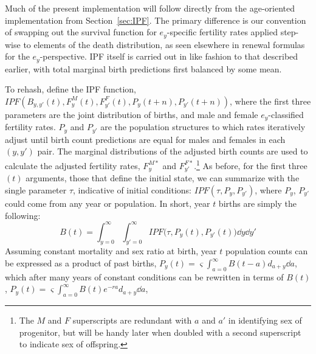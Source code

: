 
Much of the present implementation will follow directly from the age-oriented
implementation from Section~\ref{sec:IPF}. The primary difference is our
convention of swapping out the survival function for $e_y$-specific fertility
rates applied step-wise to elements of the death distribution, as seen elsewhere
in renewal formulas for the $e_y$-perspective. IPF itself is carried out in like
fashion to that described earlier, with total marginal birth predictions
first balanced by some mean. 

To rehash, define the IPF function,
$IPF(B_{y,y'}(t), F_y^M(t), F_{y'}^F(t),P_y(t+n),P_{y'}(t+n))$, where the first
three parameters are the joint distribution of births, and male and female
$e_y$-classified fertility rates. $P_y$ and $P_{y'}$ are the population
structures to which rates iteratively adjust until birth count predictions
are equal for males and females in each $(y,y')$ pair. The marginal distributions of
the adjusted birth counts are used to calculate the adjusted fertility rates,
$F_y^{M\ast}$ and $F_{y'}^{F\ast}$.\footnote{The $M$ and $F$ superscripts are
redundant with $a$ and $a'$ in identifying sex of progenitor, but will be handy
later when doubled with a second superscript to indicate sex of offspring.} As
before, for the first three $(t)$ arguments, those that define the initial
state, we can summarize with the single parameter $\tau$, indicative of initial
conditions: $IPF(\tau,P_y, P_{y'})$, where $P_y$, $P_{y'}$ could come from any
year or population. In short, year $t$ births are simply the following:
\begin{equation}
B(t) = \int _{y=0}^\infty \int _{y'=0}^\infty IPF\Big(\tau,P_y(t),
P_{y'}(t)\Big) \dd y \dd y'
\end{equation}
Assuming constant mortality and sex ratio at birth, year $t$ population counts
can be expressed as a product of past births, $P_y(t) =
\varsigma \int_{a=0}^\infty B(t-a)d_{a+y} \dd a$, which after many years of
constant conditions can be rewritten in terms of $B(t)$, $P_y(t) =
\varsigma \int_{a=0}^\infty B(t)e^{-ra}d_{a+y} \dd a$,

